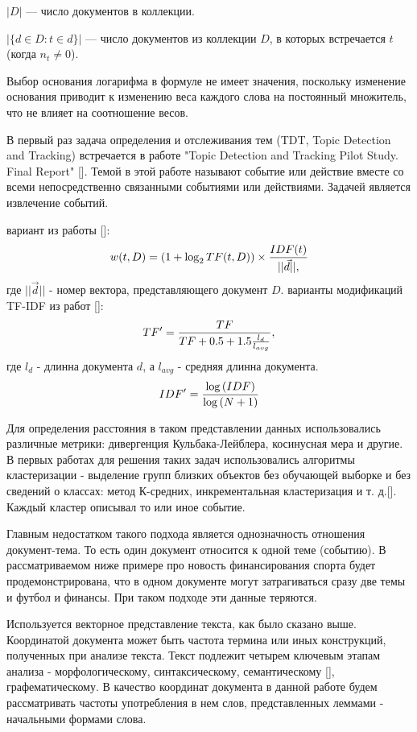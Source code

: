 $|D|$ — число документов в коллекции.

$|\{ d \in D:t \in d \}|$ — число документов из коллекции  $D$, в которых встречается  $t$ (когда $n_t \neq 0$).

Выбор основания логарифма в формуле не имеет значения, поскольку изменение основания приводит к изменению веса каждого слова на постоянный множитель, что не влияет на соотношение весов.


В первый раз задача определения и отслеживания тем (TDT, Topic Detection and Tracking) встречается в работе 
"Topic Detection and Tracking Pilot Study. Final Report" [\todo{}]. Темой в этой работе называют событие или действие вместе со всеми непосредственно связанными событиями или действиями. Задачей является извлечение событий.

 вариант из работы [\todo{}]:
$$
w(t,D)=(1+\log_2{TF(t,D)}) \times {{IDF(t)}\over{||\vec{d}||},}
$$
где $||\vec{d}||$ - номер вектора, представляющего документ $D$.
 варианты модификаций TF-IDF из работ [\todo{}]:
$$
TF'={{TF}\over{TF+0.5+1.5{{l_d}\over{l_{avg}}}}},
$$
где $l_d$ - длинна документа $d$, а $l_{avg}$ - средняя длинна документа.
$$
IDF'={{\log{(IDF)}}\over{\log{(N+1)}}}
$$

Для определения расстояния в таком представлении данных использовались различные метрики: дивергенция Кульбака-Лейблера, косинусная мера и другие. В первых работах для решения таких задач использовались алгоритмы кластеризации - выделение групп близких объектов без обучающей выборке и без сведений о классах: метод К-средних, инкрементальная кластеризация и т. д.[]. Каждый кластер описывал то или иное событие.

Главным недостатком такого подхода является однозначность отношения документ-тема. То есть один документ относится к одной теме (событию). В рассматриваемом ниже примере про новость финансирования спорта будет продемонстрирована, что в одном документе могут затрагиваться сразу две темы и футбол и финансы. При таком подходе эти данные теряются.

Используется векторное представление текста, как было сказано выше. Координатой документа может быть частота термина или иных конструкций, полученных при анализе текста. Текст подлежит четырем ключевым этапам анализа - морфологическому, синтаксическому, семантическому [], графематическому. В качество координат документа в данной работе будем рассматривать частоты употребления в нем слов, представленных леммами - начальными формами слова.

